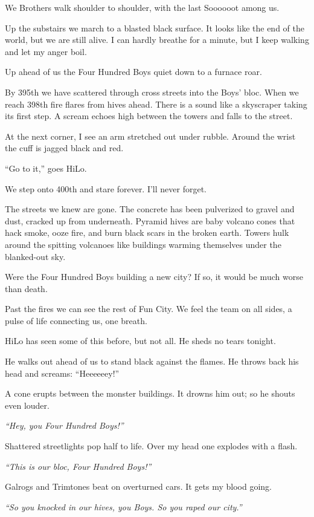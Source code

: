 We Brothers walk shoulder to shoulder, with the last Soooooot among us.

Up the substairs we march to a blasted black surface. It looks like the end of the world, but we are still alive. 
I can hardly breathe for a minute, but I keep walking and let my anger boil.

Up ahead of us the Four Hundred Boys quiet down to a furnace roar.

By 395th we have scattered through cross streets into the Boys' bloc.
When we reach 398th fire flares from hives ahead. There is a sound like a skyscraper taking its first step. A scream echoes high between the towers and falls to the street.

At the next corner, I see an arm stretched out under rubble. Around the wrist the cuff is jagged black and red.

``Go to it,'' goes HiLo.

We step onto 400th and stare forever. I'll never forget.

The streets we knew are gone. The concrete has been pulverized to gravel and dust, cracked up from underneath. Pyramid hives are baby volcano cones that hack smoke, ooze fire, and burn black scars in the broken earth. Towers hulk around the spitting volcanoes like buildings warming themselves under the blanked-out sky.

Were the Four Hundred Boys building a new city? If so, it would be much worse than death.

Past the fires we can see the rest of Fun City. We feel the team on all sides, a pulse of life connecting us, one breath.

HiLo has seen some of this before, but not all. He sheds no tears tonight.

He walks out ahead of us to stand black against the flames. He throws back his head and screams: ``Heeeeeey!''

A cone erupts between the monster buildings. It drowns him out; so he shouts even louder.

\textit{``Hey, you Four Hundred Boys!''}

Shattered streetlights pop half to life. Over my head one explodes with a flash.

\textit{``This is our bloc, Four Hundred Boys!''}

Galrogs and Trimtones beat on overturned cars. It gets my blood going.

\textit{``So you knocked in our hives, you Boys. So you raped our city.''}

